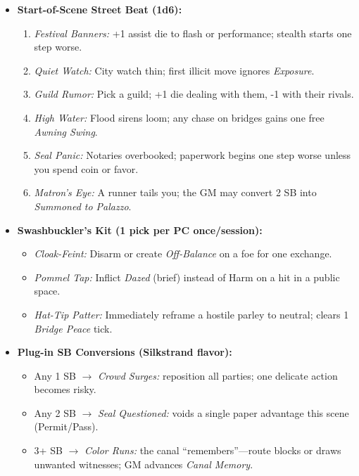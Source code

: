 \begin{itemize}
  \item \textbf{Start-of-Scene Street Beat (1d6):}
  \begin{enumerate}
    \item \emph{Festival Banners:} +1 assist die to flash or performance; stealth starts one step worse.
    \item \emph{Quiet Watch:} City watch thin; first illicit move ignores \emph{Exposure}.
    \item \emph{Guild Rumor:} Pick a guild; +1 die dealing with them, -1 with their rivals.
    \item \emph{High Water:} Flood sirens loom; any chase on bridges gains one free \emph{Awning Swing}.
    \item \emph{Seal Panic:} Notaries overbooked; paperwork begins one step worse unless you spend coin or favor.
    \item \emph{Matron’s Eye:} A runner tails you; the GM may convert 2 SB into \emph{Summoned to Palazzo}.
  \end{enumerate}

  \item \textbf{Swashbuckler’s Kit (1 pick per PC once/session):}
  \begin{itemize}
    \item \emph{Cloak-Feint:} Disarm or create \emph{Off-Balance} on a foe for one exchange.
    \item \emph{Pommel Tap:} Inflict \emph{Dazed} (brief) instead of Harm on a hit in a public space.
    \item \emph{Hat-Tip Patter:} Immediately reframe a hostile parley to neutral; clears 1 \emph{Bridge Peace} tick.
  \end{itemize}

  \item \textbf{Plug-in SB Conversions (Silkstrand flavor):}
  \begin{itemize}
    \item Any 1 SB \(\rightarrow\) \emph{Crowd Surges:} reposition all parties; one delicate action becomes risky.
    \item Any 2 SB \(\rightarrow\) \emph{Seal Questioned:} voids a single paper advantage this scene (Permit/Pass).
    \item 3+ SB \(\rightarrow\) \emph{Color Runs:} the canal “remembers”—route blocks or draws unwanted witnesses; GM advances \emph{Canal Memory}.
  \end{itemize}


\end{itemize}
